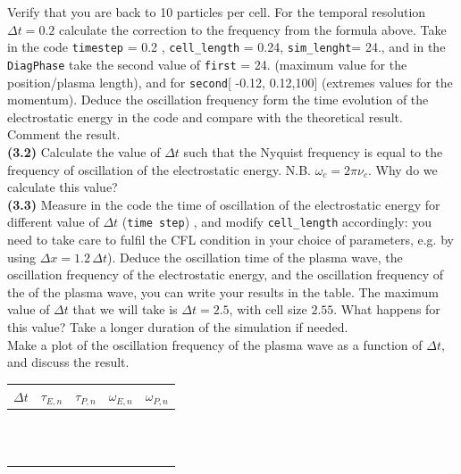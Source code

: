 \documentclass[11pt,a4paper]{article}
\begin{document}
 Verify that you are back to 10 particles per cell. For the temporal resolution $\Delta t = 0.2$ calculate the correction to the frequency from the formula above.  Take in the code \texttt{timestep} = 0.2 , \texttt{cell\_length} = 0.24, \texttt{sim\_lenght}= 24., and in the \texttt{DiagPhase} take the second value of   \texttt{first} = 24. (maximum value for the position/plasma length), and for \texttt{second}[ -0.12, 0.12,100] (extremes values for the momentum).   Deduce the oscillation frequency form the time evolution of the electrostatic energy in the code and compare with the theoretical result. Comment the result. \\
{\bf (3.2)} Calculate the value of $\Delta t $ such that the Nyquist frequency is equal to the frequency of oscillation of the electrostatic energy. N.B. $\omega_c = 2 \pi \nu_c$. Why do we calculate this value? \\
{\bf (3.3)} Measure in the code  the time of oscillation of the electrostatic energy for different value of $\Delta t$ (\texttt{time step}) , and modify \texttt{cell\_length} accordingly: you need to take care to fulfil the CFL condition in your choice of parameters, e.g. by using $\Delta x = 1.2\,\Delta t$). Deduce the oscillation time of the plasma wave, the oscillation frequency of the electrostatic energy, and the oscillation frequency of the of the plasma wave, you can write your results in the table. The maximum value of $\Delta t $ that we will take is $\Delta t = 2.5$, with cell size $2.55$. What happens for this value? Take a longer duration of the simulation if needed. \\
 Make a plot of the oscillation frequency of the plasma wave as a function of $\Delta t$, and discuss the result. \\


\begin{tabularx}{\textwidth}{X|X|X|X|X}
\centering\large\textbf{$\Delta t$} & \centering\large\textbf{$\tau_{E,n}$} & \centering\large\textbf{$\tau_{P,n}$} &  \centering\large\textbf{$\omega_{E,n}$} & \centering\arraybackslash\large\textbf{$\omega_{P,n}$} \\
\hline
 & & & & \\  & & & & \\ \hline  & & & & \\  & & & & \\ \hline  & & & & \\  & & & & \\ \hline  & & & & \\  & & & & \\ \hline  & & & & \\  & & & & \\ \hline  & & & & \\  & & & & \\ 
\end{tabularx}
\end{document}

